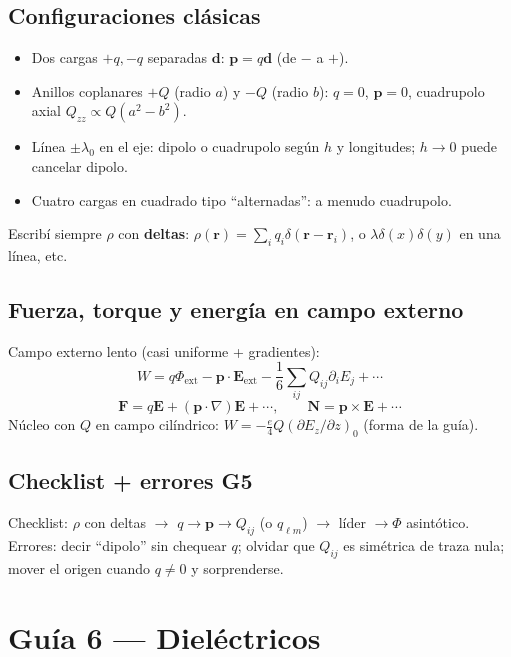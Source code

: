 \documentclass[10pt,a4paper]{article}
\newcommand{\vect}[1]{\mathbf{#1}}
\begin{document}
\subsection{Configuraciones clásicas}
\begin{itemize}
\item Dos cargas $+q,-q$ separadas $\vect{d}$: $\vect{p}=q\vect{d}$ (de $-$ a $+$).
\item Anillos coplanares $+Q$ (radio $a$) y $-Q$ (radio $b$): $q=0$, $\vect{p}=0$, cuadrupolo axial $Q_{zz}\propto Q(a^2-b^2)$.
\item Línea $\pm\lambda_0$ en el eje: dipolo o cuadrupolo según $h$ y longitudes; $h\to 0$ puede cancelar dipolo.
\item Cuatro cargas en cuadrado tipo ``alternadas'': a menudo cuadrupolo.
\end{itemize}
Escribí siempre $\rho$ con \textbf{deltas}:
$\rho(\vect{r})=\sum_i q_i\delta(\vect{r}-\vect{r}_i)$, o $\lambda\delta(x)\delta(y)$ en una línea, etc.

\subsection{Fuerza, torque y energía en campo externo}
Campo externo lento (casi uniforme + gradientes):
\[
W=q\Phi_{\mathrm{ext}}-\vect{p}\cdot\vect{E}_{\mathrm{ext}}-\frac16\sum_{ij}Q_{ij}\partial_i E_j+\cdots
\]
\[
\vect{F}=q\vect{E}+(\vect{p}\cdot\nabla)\vect{E}+\cdots,\qquad
\vect{N}=\vect{p}\times\vect{E}+\cdots
\]
Núcleo con $Q$ en campo cilíndrico: $W=-\frac{e}{4}Q(\partial E_z/\partial z)_0$ (forma de la guía).

\subsection{Checklist + errores G5}
Checklist: $\rho$ con deltas $\to$ $q\to\vect{p}\to Q_{ij}$ (o $q_{\ell m}$) $\to$ líder $\to\Phi$ asintótico.\\
Errores: decir ``dipolo'' sin chequear $q$; olvidar que $Q_{ij}$ es simétrica de traza nula; mover el origen cuando $q\neq 0$ y sorprenderse.

\section{Guía 6 --- Dieléctricos}
\end{document}
